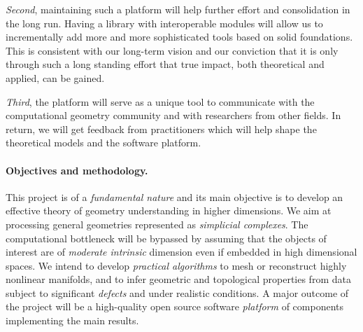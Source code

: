 {\em Second}, maintaining such a platform will help further effort and consolidation in the long run.  Having a library with interoperable modules will allow us to incrementally add more and more sophisticated tools based on solid foundations.  This is consistent with our long-term vision and our conviction that it is only through such a long standing effort that true impact, both theoretical and applied, can be gained.

{\em Third}, the platform will serve as a unique tool to communicate with the computational geometry community and with researchers from other fields. 
 In return, we will get feedback from practitioners which will help shape the theoretical models and the software platform.


 




\paragraph{Objectives and methodology.}
This project is of a {\em fundamental nature} and its main objective is to develop an effective theory of geometry understanding in higher dimensions. We aim at processing general geometries represented as {\em simplicial complexes}. The computational bottleneck will be bypassed by assuming that the objects of interest are of {\em moderate intrinsic} dimension even if embedded in high dimensional spaces. We intend to develop {\em practical algorithms} to mesh or reconstruct highly nonlinear manifolds, and to infer geometric and topological properties from data subject to significant {\em defects} and
 under realistic conditions. A major outcome of the project will be a high-quality open source software {\em platform} of components implementing the main results.

